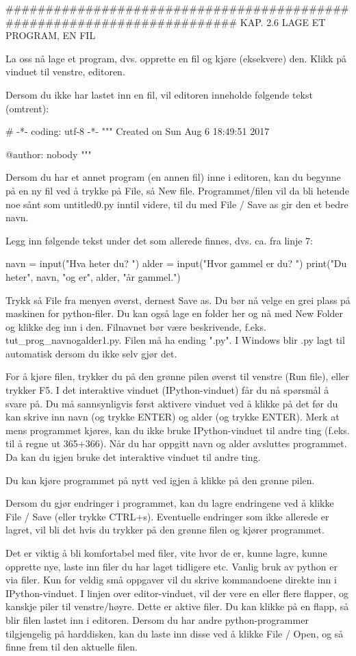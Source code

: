 \documentclass[a4paper,11pt,utf8]{book}
\begin{document}
######################################################################## 
KAP. 2.6  LAGE ET PROGRAM, EN FIL

La oss nå lage et program, dvs. opprette en fil og kjøre (eksekvere) den. 
Klikk på vinduet til venstre, editoren. 

Dersom du ikke har lastet inn en fil, vil editoren inneholde følgende tekst (omtrent): 

# -*- coding: utf-8 -*-
"""
Created on Sun Aug  6 18:49:51 2017

@author: nobody
"""

Dersom du har et annet program (en annen fil) inne i editoren,
kan du begynne på en ny fil ved å trykke på File, så New file.
Programmet/filen vil da bli hetende noe sånt som untitled0.py inntil videre,
til du med File / Save as gir den et bedre navn. 

Legg inn følgende tekst under det som allerede finnes, dvs. ca. fra linje 7: 

navn = input("Hva heter du? ")
alder = input("Hvor gammel er du? ") 
print("Du heter", navn, "og er", alder, "år gammel.") 

Trykk så File fra menyen øverst, dernest Save as. 
Du bør nå velge en grei plass på maskinen for python-filer. 
Du kan også lage en folder her og nå med New Folder og klikke deg inn i den. 
Filnavnet bør være beskrivende, f.eks. tut_prog_navnogalder1.py. 
Filen må ha ending ".py". 
I Windows blir .py lagt til automatisk dersom du ikke selv gjør det. 


For å kjøre filen, trykker du på den grønne pilen øverst til venstre (Run file),
eller trykker F5. 
I det interaktive vinduet (IPython-vinduet) får du nå spørsmål å svare på. 
Du må sannsynligvis først aktivere vinduet ved å klikke på det
før du kan skrive inn navn (og trykke ENTER) og alder (og trykke ENTER). 
Merk at mens programmet kjøres, kan du ikke bruke IPython-vinduet til andre ting
(f.eks. til å regne ut 365+366). 
Når du har oppgitt navn og alder avsluttes programmet.
Da kan du igjen bruke det interaktive vinduet til andre ting. 

Du kan kjøre programmet på nytt ved igjen å klikke på den grønne pilen.

Dersom du gjør endringer i programmet, kan du lagre endringene ved å
klikke File / Save (eller trykke CTRL+s). 
Eventuelle endringer som ikke allerede er lagret, vil bli det hvis du trykker på
den grønne filen og kjører programmet.


Det er viktig å bli komfortabel med filer, vite hvor de er, kunne lagre,
kunne opprette nye, laste inn filer du har laget tidligere etc.
Vanlig bruk av python er via filer. 
Kun for veldig små oppgaver vil du skrive kommandoene direkte inn i IPython-vinduet. 
I linjen over editor-vinduet, vil der vere en eller flere flapper,
og kanskje piler til venstre/høyre.
Dette er aktive filer. Du kan klikke på en flapp, så blir filen lastet inn i editoren.
Dersom du har andre python-programmer tilgjengelig på harddisken,
kan du laste inn disse ved å klikke File / Open, og så finne frem til den aktuelle filen. 
\end{document}
